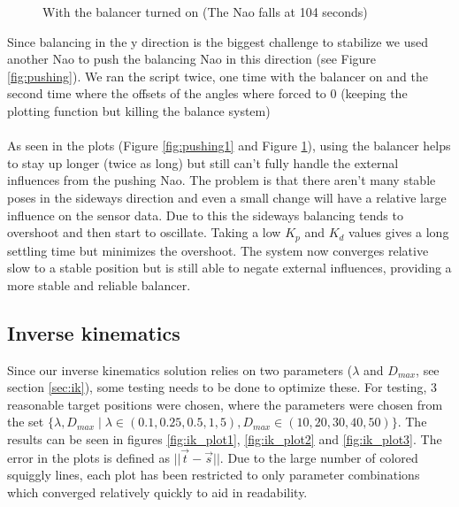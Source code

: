 \documentclass[a4paper]{article}
\begin{document}
\begin{figure}[htbp]
  \centering
  \caption{With the balancer turned on (The Nao falls at 104 seconds)}
  \label{fig:pushing2}
\end{figure}
Since balancing in the y direction is the biggest challenge to stabilize we used another Nao to push the balancing Nao in this direction (see  Figure \ref{fig:pushing}).
We ran the script twice, one time with the balancer on and the second time where the offsets of the angles where forced to 0  (keeping the plotting function but killing the balance system)\\\\
As seen in the plots (Figure \ref{fig:pushing1} and Figure \ref{fig:pushing2}), using the balancer helps to stay up longer (twice as long) but still can't fully handle the external influences from the pushing Nao.
The problem is that there aren't many stable poses in the sideways direction and even a small change will have a relative large influence on the sensor data.
Due to this the sideways balancing tends to overshoot and then start to oscillate.
Taking a low $K_p$ and $K_d$ values gives a long settling time but minimizes the overshoot.  
The system now converges relative slow to a stable position but is still able to negate external influences, providing a more stable and reliable balancer. 
\FloatBarrier
\subsection{Inverse kinematics}
\FloatBarrier
Since our inverse kinematics solution relies on two parameters
($\lambda$ and $D_{max}$, see section \ref{sec:ik}), some testing needs to be
done to optimize these. For testing, 3 reasonable target positions were chosen,
where the parameters were chosen from the set $\{\lambda, D_{max} \mid \lambda \in
  (0.1, 0.25, 0.5, 1, 5), D_{max} \in (10, 20, 30, 40, 50)\}$. The results can be
seen in figures \ref{fig:ik_plot1}, \ref{fig:ik_plot2} and \ref{fig:ik_plot3}.
The error in the plots is defined as $|| \vec{t} - \vec{s} ||$. Due to the large
number of colored squiggly lines, each plot has been restricted to only
parameter combinations which converged relatively quickly to aid in readability.
\end{document}
